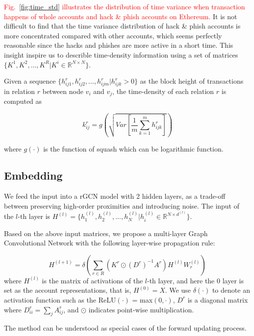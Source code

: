 \textcolor{red}{Fig.~\ref{fig:time_std} illustrates the distribution of time variance when transaction happens of whole accounts and hack \& phish accounts on Ethereum.} It is not difficult to find that the time variance distribution of hack \& phish accounts is more concentrated compared with other accounts, which seems perfectly reasonable since the hacks and phishes are more active in a short time. This insight inspire us to describle time-density information using a set of matrices $\{K^1,K^2,\dots,K^R|K^i\in \mathbb{R}^{N \times N}\}$.

Given a sequence $\{h_{ij1}^r,h_{ij2}^r,\dots,h_{ijm}^r | h_{ijk}^r>0\}$ as the block height of transactions in relation $r$ between node $v_i$ and $v_j$, the time-density of each relation $r$ is computed as%

\begin{equation}
k_{ij}^r=g(\sqrt{Var[\frac{1}{m}\sum_{k=1}^m h_{ijk}^r]})
\label{eq:time}
\end{equation}

\noindent where $g(\cdot)$ is the function of squash which can be logarithmic function.

\subsection{Embedding}
\label{sec:rGCN layers}
 We feed the input into a rGCN model with 2 hidden layers, as a trade-off between preserving high-order proximities and introducing noise. The input of the $l$-th layer is $H^{(l)}=\{h_1^{(l)},h_2^{(l)},...,h_N^{(l)}|h_i^{(l)}\in \mathbb{R}^{N \times d^{(l)}}\}$.

Based on the above input matrices, we propose a multi-layer Graph Convolutional Network with the following layer-wise propagation rule:

\begin{equation}
H^{(l+1)}=\delta(\sum_{r\in R} (K^r\odot (D^r)^{-1}A^r)H^{(l)}W_r^{(l)})
\end{equation}
\noindent where $H^{(l)}$ is the matrix of activations of the $l$-th layer, and here the $0$ layer is set as the account representations, that is, $H^{(0)}=X$. We use $\delta(\cdot)$ to denote an activation function such as the ReLU$(\cdot)$ = max$(0,\cdot)$, $D^r$ is a diagonal matrix where $D^r_{ii}=\sum_{j}A^r_{ij}$, and $\odot$ indicates point-wise multiplication.


The method can be understood as special cases of the forward updating process.

